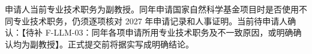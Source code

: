 \justifying
\NSFCBodyText

申请人当前专业技术职务为副教授。同年申请国家自然科学基金项目时是否使用不同专业技术职务，仍须逐项核对 2027 年申请记录和人事证明。当前待申请人确认：【待补 F-LLM-03：同年各项申请所用专业技术职务及不一致原因，或明确确认均为副教授】。正式提交前将据实写成明确结论。
